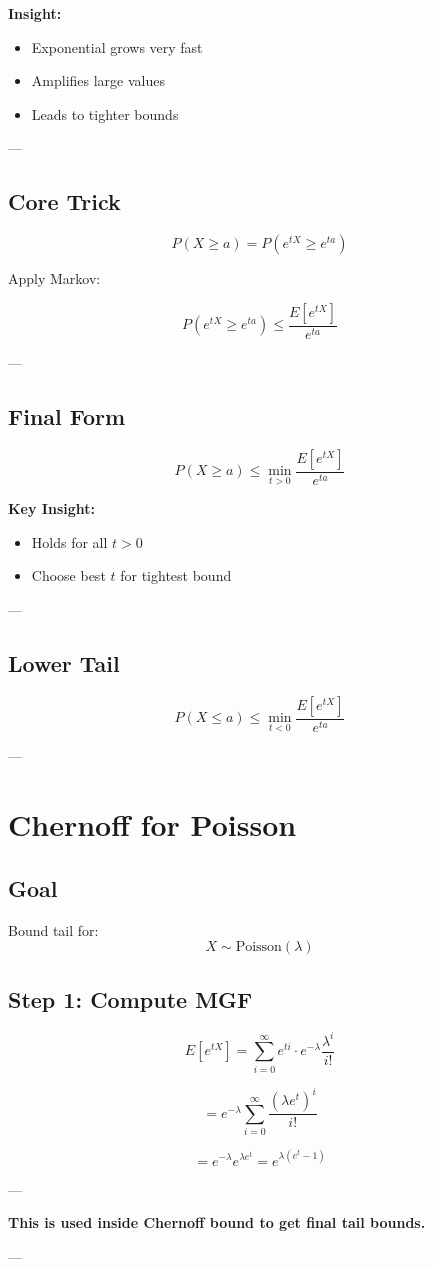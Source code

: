\documentclass[12pt]{article}
\begin{document}
\textbf{Insight:}
\begin{itemize}
    \item Exponential grows very fast
    \item Amplifies large values
    \item Leads to tighter bounds
\end{itemize}

---

\subsection{Core Trick}

\[
P(X \ge a) = P(e^{tX} \ge e^{ta})
\]

Apply Markov:

\[
P(e^{tX} \ge e^{ta}) \le \frac{E[e^{tX}]}{e^{ta}}
\]

---

\subsection{Final Form}

\[
P(X \ge a) \le \min_{t > 0} \frac{E[e^{tX}]}{e^{ta}}
\]

\textbf{Key Insight:}
\begin{itemize}
    \item Holds for all $t > 0$
    \item Choose best $t$ for tightest bound
\end{itemize}

---

\subsection{Lower Tail}

\[
P(X \le a) \le \min_{t < 0} \frac{E[e^{tX}]}{e^{ta}}
\]

---

\section{Chernoff for Poisson}

\subsection{Goal}

Bound tail for:
\[
X \sim \text{Poisson}(\lambda)
\]

\subsection{Step 1: Compute MGF}

\[
E[e^{tX}] = \sum_{i=0}^{\infty} e^{ti} \cdot e^{-\lambda} \frac{\lambda^i}{i!}
\]

\[
= e^{-\lambda} \sum_{i=0}^{\infty} \frac{(\lambda e^t)^i}{i!}
\]

\[
= e^{-\lambda} e^{\lambda e^t}
= e^{\lambda (e^t - 1)}
\]

---

\textbf{This is used inside Chernoff bound to get final tail bounds.}

---
\end{document}
